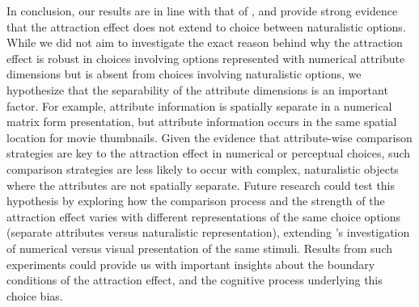 \documentclass[12pt, a4paper]{article}
\begin{document}
In conclusion, our results are in line with that of , and provide strong evidence that the attraction effect does not extend to choice between naturalistic options. While we did not aim to investigate the exact reason behind why the attraction effect is robust in choices involving options represented with numerical attribute dimensions but is absent from choices involving naturalistic options, we hypothesize that the separability of the attribute dimensions is an important factor. For example, attribute information is spatially separate in a numerical matrix form presentation, but attribute information occurs in the same spatial location for movie thumbnails. Given the evidence that attribute-wise comparison strategies are key to the attraction effect in numerical or perceptual choices, such comparison strategies are less likely to occur with complex, naturalistic objects where the attributes are not spatially separate. Future research could test this hypothesis by exploring how the comparison process and the strength of the attraction effect varies with different representations of the same choice options (separate attributes versus naturalistic representation), extending \citeauthor{Frederick2014}'s investigation of numerical versus visual presentation of the same stimuli. Results from such experiments could provide us with important insights about the boundary conditions of the attraction effect, and the cognitive process underlying this choice bias.









\newpage


\end{document}
